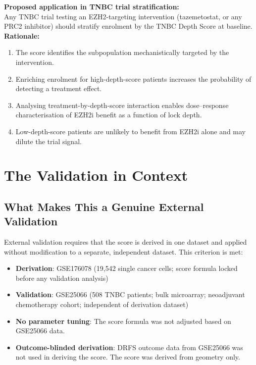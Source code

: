 \documentclass[12pt, a4paper]{article}
\begin{document}
\begin{center}
\colorbox{actionbox}{
\begin{minipage}{0.88\textwidth}
\vspace{0.5em}
\textbf{Proposed application in TNBC trial
stratification:}\\[0.4em]
Any TNBC trial testing an EZH2-targeting
intervention (tazemetostat, or any PRC2
inhibitor) should stratify enrolment by
the TNBC Depth Score at baseline.\\[0.4em]
\textbf{Rationale:}
\begin{enumerate}[leftmargin=*, itemsep=3pt]
    \item The score identifies the subpopulation
    mechanistically targeted by the intervention.
    \item Enriching enrolment for high-depth-score
    patients increases the probability of detecting
    a treatment effect.
    \item Analysing treatment-by-depth-score
    interaction enables dose--response
    characterisation of EZH2i benefit as a
    function of lock depth.
    \item Low-depth-score patients are unlikely
    to benefit from EZH2i alone and may dilute
    the trial signal.
\end{enumerate}
\vspace{0.4em}
\end{minipage}}
\end{center}

\section{The Validation in Context}

\subsection{What Makes This a Genuine External
Validation}

External validation requires that the score is
derived in one dataset and applied without
modification to a separate, independent dataset.
This criterion is met:

\begin{itemize}
    \item \textbf{Derivation}: GSE176078
    (19,542 single cancer cells; score formula
    locked before any validation analysis)
    \item \textbf{Validation}: GSE25066
    (508 TNBC patients; bulk microarray;
    neoadjuvant chemotherapy cohort;
    independent of derivation dataset)
    \item \textbf{No parameter tuning}: The
    score formula was not adjusted based on
    GSE25066 data.
    \item \textbf{Outcome-blinded derivation}:
    DRFS outcome data from GSE25066 was not
    used in deriving the score. The score was
    derived from geometry only.
\end{itemize}
\end{document}
